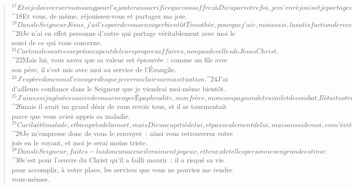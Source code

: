 \begin{verse}
${}^{17}Et si je dois verser mon sang pour l’ajouter au sacrifice que vous offrez à Dieu par votre foi, je m’en réjouis et je partage votre joie à tous. 
${}^{18}Et vous, de même, réjouissez-vous et partagez ma joie.
${}^{19}Dans le Seigneur Jésus, j’ai l’espoir de vous envoyer bientôt Timothée, pour que j’aie, moi aussi, la satisfaction de recevoir de vos nouvelles. 
${}^{20}Je n’ai en effet personne d’autre qui partage véritablement avec moi le souci de ce qui vous concerne. 
${}^{21}Car tous les autres se préoccupent de leurs propres affaires, non pas de celles de Jésus Christ. 
${}^{22}Mais lui, vous savez que sa valeur est éprouvée : comme un fils avec son père, il s’est mis avec moi au service de l’Évangile. 
${}^{23}J’espère donc vous l’envoyer dès que je verrai clair sur ma situation. 
${}^{24}J’ai d’ailleurs confiance dans le Seigneur que je viendrai moi-même bientôt.
${}^{25}J’ai aussi jugé nécessaire de vous envoyer Épaphrodite, mon frère, mon compagnon de travail et de combat. Il était votre envoyé, pour me rendre les services dont j’avais besoin, 
${}^{26}mais il avait un grand désir de vous revoir tous, et il se tourmentait parce que vous aviez appris sa maladie. 
${}^{27}Car il a été malade, et bien près de la mort, mais Dieu a eu pitié de lui, et pas seulement de lui, mais aussi de moi, en m’évitant d’avoir tristesse sur tristesse. 
${}^{28}Je m’empresse donc de vous le renvoyer : ainsi vous retrouverez votre joie en le voyant, et moi je serai moins triste. 
${}^{29}Dans le Seigneur, faites-lui donc un accueil vraiment joyeux, et tenez de telles personnes en grande estime : 
${}^{30}c’est pour l’œuvre du Christ qu’il a failli mourir ; il a risqué sa vie pour accomplir, à votre place, les services que vous ne pouviez me rendre vous-mêmes.
      

\end{verse}
